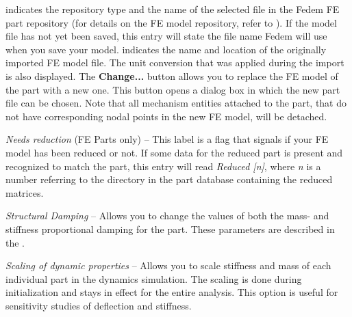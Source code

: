 \begin{bulletlist}
  \begin{itemize}
    indicates the repository type and the name of the selected  file
    in the Fedem FE part repository
    (for details on the FE model repository, refer to
    ).
    If the model file has not yet been saved, this entry will state
    the file name Fedem will use when you save your model.
    indicates the name and location of the originally imported FE model file.
    The unit conversion that was applied during the import is also displayed.
  \subitem The \textbf{Change...} button
    allows you to replace the FE model of the part with a new one.
    This button opens a dialog box in which the new part file can be chosen.
    Note that all mechanism entities attached to the part, that do not have
    corresponding nodal points in the new FE model, will be detached.
  \end{itemize}

\item{\sl Needs reduction} (FE Parts only) --
  This label is a flag that signals if your FE model has been reduced or not.
  If some data for the reduced part is present and recognized to match the part,
  this entry will read {\sl Reduced [n]}, where {\sl n} is a number referring to
  the directory in the part database containing the reduced matrices.

\item{\sl Structural Damping} --
  Allows you to change the values of both the mass- and stiffness proportional
  damping for the part. These parameters are described in the
  .

\item{\sl Scaling of dynamic properties} --
  Allows you to scale stiffness and mass of each individual part
  in the dynamics simulation. The scaling is done during initialization
  and stays in effect for the entire analysis.
  This option is useful for sensitivity studies of deflection and stiffness.




\end{bulletlist}
